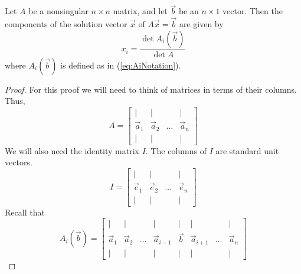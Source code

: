 \documentclass{ximera}
\begin{document}
\begin{theorem}\label{th:cramer}
Let $A$ be a nonsingular $n\times n$ matrix, and let $\vec{b}$ be an $n\times 1$ vector.  Then the components of the solution vector $\vec{x}$ of $A\vec{x}=\vec{b}$ are given by
$$x_i=\frac{\det{A_i(\vec{b})}}{\det{A}}$$
where $A_i(\vec{b})$ is defined as in (\ref{eq:AiNotation}).
\end{theorem}
\begin{proof}
For this proof we will need to think of matrices in terms of their columns.  Thus,
$$A=\begin{bmatrix}
           | & |& &|\\
        \vec{a}_1 & \vec{a}_2&\dots&\vec{a}_n\\
        | & |& &|
         \end{bmatrix}$$
We will also need the identity matrix $I$.  The columns of $I$ are standard unit vectors.
$$I=\begin{bmatrix}
           | & |& &|\\
        \vec{e}_1 & \vec{e}_2&\dots&\vec{e}_n\\
        | & |& &|
         \end{bmatrix}$$
Recall that
$$A_i(\vec{b})=\begin{bmatrix}
           | & |& &|&|&|&&|\\
        \vec{a}_1 & \vec{a}_2&\dots &\vec{a}_{i-1}&\vec{b}&\vec{a}_{i+1}&\dots&\vec{a}_n\\
        | & |& &|&|&|&&|
         \end{bmatrix}$$
          

\end{proof}
\end{document}
